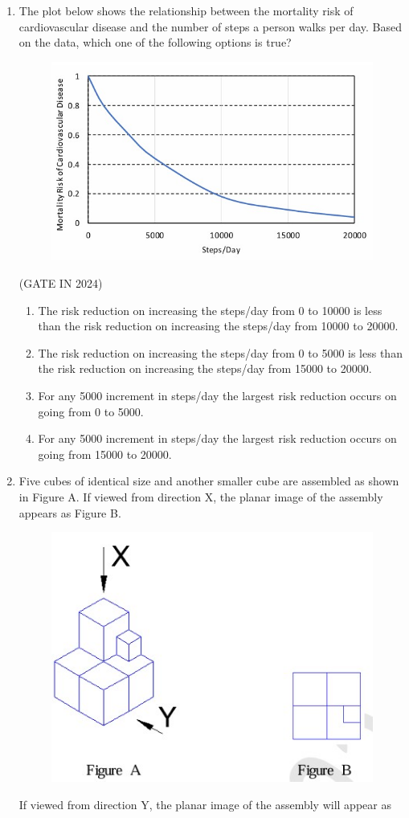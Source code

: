\documentclass[journal,12pt,onecolumn]{IEEEtran}
\theoremstyle{remark}
\begin{document}
\begin{enumerate}
    \item The plot below  shows the relationship between the mortality risk of cardiovascular
    disease and the number of steps a person walks per day. Based on the data, which
    one of the following options is true?
    \begin{figure}[H]
        \centering
        \includegraphics[width=0.35\columnwidth]{figs/p2.jpg}
        \caption*{}
        \label{fig:p2}
    \end{figure}

\newpage
    
    \hfill{(GATE IN 2024)}
    \begin{enumerate}
        \item The risk reduction on increasing the steps/day from 0 to 10000 is less than the risk
        reduction on increasing the steps/day from 10000 to 20000.
        \item The risk reduction on increasing the steps/day from 0 to 5000 is less than the risk
        reduction on increasing the steps/day from 15000 to 20000.
        \item For any 5000 increment in steps/day the largest risk reduction occurs on going from
        0 to 5000.
        \item For any 5000 increment in steps/day the largest risk reduction occurs on going from
        15000 to 20000.
    \end{enumerate}

    \item Five cubes of identical size and another smaller cube are assembled as shown in
    Figure A.  If viewed from direction X, the planar image of the assembly appears as
    Figure B.
    \begin{figure}[H]
        \centering
        \includegraphics[width=0.5\columnwidth]{figs/p3.jpg}
        \caption*{}
        \label{fig:p3}
    \end{figure}
    If viewed from direction Y, the planar image of the assembly  will
    appear as
    

\end{enumerate}
\end{document}
